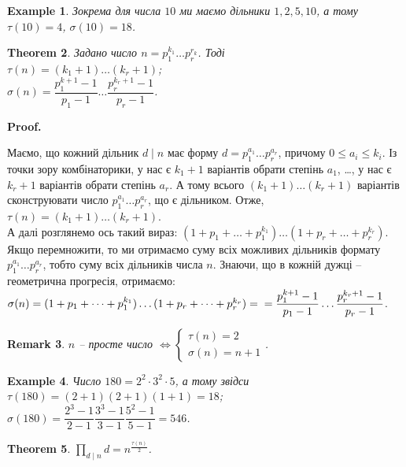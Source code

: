 \documentclass[a4paper, 10pt]{article}
\makeatletter
\theoremstyle{theoremdd}
\newtheorem{theorem}{Theorem}[subsection]
\theoremstyle{theoremdd}
\theoremstyle{theoremdd}
\theoremstyle{theoremdd}
\newtheorem{example}[theorem]{Example}
\theoremstyle{theoremdd}
\theoremstyle{theoremdd}
\newtheorem{remark}[theorem]{Remark}
\theoremstyle{theoremdd}
\theoremstyle{theoremdd}
\renewenvironment{proof}[1][Proof.\\]{\par
\pushQED{\hfill \qed}%
\normalfont \topsep6\p@\@plus6\p@\relax
\trivlist
\item\relax
{\bfseries
#1\@addpunct{.}}\hspace\labelsep\ignorespaces
}{%
\popQED\endtrivlist\@endpefalse
}
\makeatother
\begin{document}
\begin{example}
Зокрема для числа $10$ ми маємо дільники $1,2,5,10$, а тому $\tau(10) = 4$, \quad $\sigma(10) = 18$.
\end{example}

\begin{theorem}
Задано число $n = p_1^{k_1} \dots p_r^{r_k}$. Тоді\\
$\tau(n) = (k_1+1) \dots (k_r+1)$;\\
$\sigma(n) = \dfrac{p_1^{k+1}-1}{p_1-1} \dots \dfrac{p_r^{k_r+1}-1}{p_r-1}$.
\end{theorem}

\begin{proof}
Маємо, що кожний дільник $d \mid n$ має форму $d = p_1^{a_1} \dots p_r^{a_r}$, причому $0 \leq a_i \leq k_i$. Із точки зору комбінаторики, у нас є $k_1+1$ варіантів обрати степінь $a_1$, \dots, у нас є $k_r+1$ варіантів обрати степінь $a_r$. А тому всього $(k_1+1) \dots (k_r+1)$ варіантів сконструювати число $p_1^{a_1} \dots p_r^{a_r}$, що є дільником. Отже, $\tau(n) = (k_1+1) \dots (k_r+1)$.
\bigskip \\
А далі розглянемо ось такий вираз: $(1+p_1+\dots +p_1^{k_1}) \dots (1+p_r+\dots+p_r^{k_r})$. Якщо перемножити, то ми отримаємо суму всіх можливих дільників формату $p_1^{a_1} \dots p_r^{a_r}$, тобто суму всіх дільників числа $n$. Знаючи, що в кожній дужці -- геометрична прогресія, отримаємо:\\
$\sigma(n) = (1+p_1+\dots +p_1^{k_1}) \dots (1+p_r+\dots+p_r^{k_r}) = \\ = \dfrac{p_1^{k+1}-1}{p_1-1} \dots \dfrac{p_r^{k_r+1}-1}{p_r-1}$.
\end{proof}

\begin{remark}
$n$ -- просте число $\iff \begin{cases} \tau(n) =2 \\ \sigma(n) = n+1 \end{cases}$.
\end{remark}

\begin{example}
Число $180 = 2^2 \cdot 3^2 \cdot 5$, а тому звідси\\
$\tau(180) = (2+1)(2+1)(1+1) = 18$;\\
$\sigma(180) = \dfrac{2^3-1}{2-1} \dfrac{3^3-1}{3-1} \dfrac{5^2-1}{5-1} = 546$.
\end{example}

\begin{theorem}
$\displaystyle\prod_{d \mid n} d = n^{\frac{\tau(n)}{2}}$.
\end{theorem}
\end{document}
